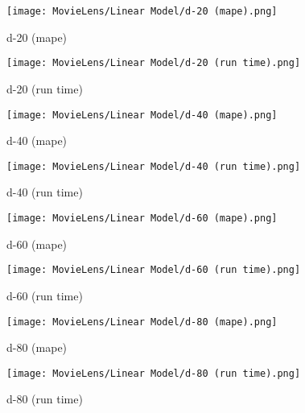 \documentclass[12pt]{article}
\begin{document}
\begin{figure}[H]
\centering
    \begin{minipage}{0.45\textwidth}
        \centering
        \texttt{[image: MovieLens/Linear Model/d-20 (mape).png]}
        \caption{d-20 (mape)}
        
    \end{minipage}\hfill
    \begin{minipage}{0.45\textwidth}
        \centering
        \texttt{[image: MovieLens/Linear Model/d-20 (run time).png]}
        \caption{d-20 (run time)}
    \end{minipage}
\end{figure}

\begin{figure}[H]
\centering
    \begin{minipage}{0.45\textwidth}
        \centering
        \texttt{[image: MovieLens/Linear Model/d-40 (mape).png]}
        \caption{d-40 (mape)}
        
    \end{minipage}\hfill
    \begin{minipage}{0.45\textwidth}
        \centering
        \texttt{[image: MovieLens/Linear Model/d-40 (run time).png]}
        \caption{d-40 (run time)}
    \end{minipage}
\end{figure}

\begin{figure}[H]
\centering
    \begin{minipage}{0.45\textwidth}
        \centering
        \texttt{[image: MovieLens/Linear Model/d-60 (mape).png]}
        \caption{d-60 (mape)}
        
    \end{minipage}\hfill
    \begin{minipage}{0.45\textwidth}
        \centering
        \texttt{[image: MovieLens/Linear Model/d-60 (run time).png]}
        \caption{d-60 (run time)}
    \end{minipage}
\end{figure}

\begin{figure}[H]
\centering
    \begin{minipage}{0.45\textwidth}
        \centering
        \texttt{[image: MovieLens/Linear Model/d-80 (mape).png]}
        \caption{d-80 (mape)}
        
    \end{minipage}\hfill
    \begin{minipage}{0.45\textwidth}
        \centering
        \texttt{[image: MovieLens/Linear Model/d-80 (run time).png]}
        \caption{d-80 (run time)}
    \end{minipage}
\end{figure}
\end{document}
